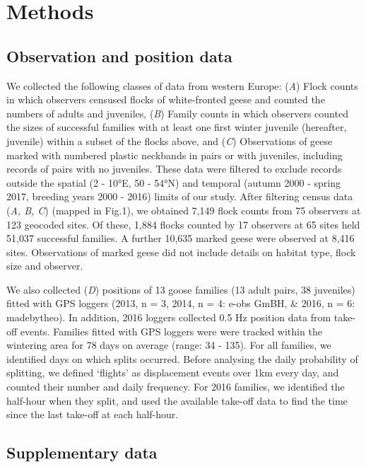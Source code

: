 \documentclass[10pt,twocolumn]{paper}
\begin{document}
\section{Methods}\label{methods}

\subsection{Observation and position
data}\label{observation-and-position-data}

We collected the following classes of data from western Europe:
(\emph{A}) Flock counts in which observers censused flocks of
white-fronted geese and counted the numbers of adults and juveniles,
(\emph{B}) Family counts in which observers counted the sizes of
successful families with at least one first winter juvenile (hereafter,
juvenile) within a subset of the flocks above, and (\emph{C})
Observations of geese marked with numbered plastic neckbands in pairs or
with juveniles, including records of pairs with no juveniles. These data
were filtered to exclude records outside the spatial (2 - 10°E, 50 -
54°N) and temporal (autumn 2000 - spring 2017, breeding years 2000 -
2016) limits of our study. After filtering census data (\emph{A, B, C})
(mapped in Fig.1), we obtained 7,149 flock counts from 75 observers at
123 geocoded sites. Of these, 1,884 flocks counted by 17 observers at 65
sites held 51,037 successful families. A further 10,635 marked geese
were observed at 8,416 sites. Observations of marked geese did not
include details on habitat type, flock size and observer.

We also collected (\emph{D}) positions of 13 goose families (13 adult
pairs, 38 juveniles) fitted with GPS loggers (2013, n = 3, 2014, n = 4:
e-obs GmBH, \& 2016, n = 6: madebytheo). In addition, 2016 loggers
collected 0.5 Hz position data from take-off events. Families fitted
with GPS loggers were were tracked within the wintering area for 78 days
on average (range: 34 - 135). For all families, we identified days on
which splits occurred. Before analysing the daily probability of
splitting, we defined `flights' as displacement events over 1km every
day, and counted their number and daily frequency. For 2016 families, we
identified the half-hour when they split, and used the available
take-off data to find the time since the last take-off at each
half-hour.

\subsection{Supplementary data}\label{supplementary-data}
\end{document}
